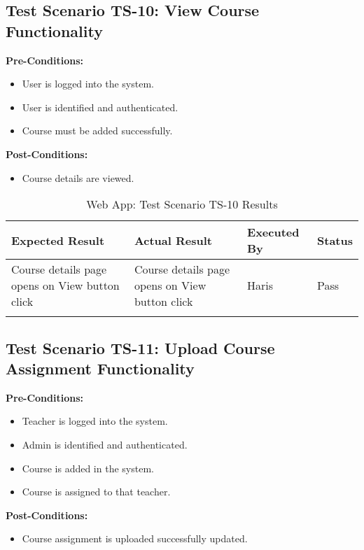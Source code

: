 \subsection{Test Scenario TS-10: View Course Functionality}

\textbf{Pre-Conditions: }
\begin{itemize}

\item User is logged into the system.
\item User is identified and authenticated.
\item Course must be added successfully.

\end{itemize}
\textbf{Post-Conditions: }
\begin{itemize}
\item Course details are viewed.
\end{itemize}

\begin{longtable}{|p{4cm}|p{4cm}|p{2cm}|p{2cm}|}
\hline
\textbf{Expected Result} & \textbf{Actual Result} & \textbf{Executed By} & \textbf{Status}\\
\hline
Course details page opens on View button click &
Course details page opens on View button click &
Haris &
Pass \\
\hline

\caption{Web App: Test Scenario TS-10 Results}
\end{longtable}


\subsection{Test Scenario TS-11: Upload Course Assignment Functionality}
\textbf{Pre-Conditions: } 
\begin{itemize}

\item Teacher is logged into the system.
\item Admin is identified and authenticated.
\item Course is added in the system.
\item Course is assigned to that teacher.

\end{itemize}

\textbf{Post-Conditions: } 
\begin{itemize}
\item Course assignment is uploaded successfully updated.
\end{itemize}

